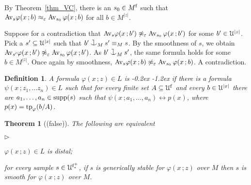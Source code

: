 \documentclass[10pt,openany]{article}
\newcommand{\mylabel}[1]{{\ssf{#1}}\hfill}
\renewenvironment{itemize}
  {\begin{list}{$\triangleright$}{%
   \setlength{\parskip}{0mm}
   \setlength{\topsep}{.4\baselineskip}
   \setlength{\rightmargin}{0mm}
   \setlength{\listparindent}{0mm}
   \setlength{\itemindent}{0mm}
   \setlength{\labelwidth}{3ex}
   \setlength{\itemsep}{.4\baselineskip}
   \setlength{\parsep}{0mm}
   \setlength{\partopsep}{0mm}
   \setlength{\labelsep}{1ex}
   \setlength{\leftmargin}{\labelwidth+\labelsep}
   \let\makelabel\mylabel}}{%
   \end{list}\vspace*{-\parskip}}
\def\supp{\mathop{\rm supp}}
\def\tp{{\rm tp}}
\def\cnonfork{\mathbin{\raise1.8ex\rlap{\kern0.6ex\rule{0.6ex}{0.1ex}}
\rlap{\kern1.1ex\rule{0.1ex}{1.9ex}}\raise-0.3ex\hbox{$\smile$} } }
\def\iff{\leftrightarrow}
\def\U{\EuScript U}
\def\phi{\varphi}
\def\epsilon{\varepsilon}
\def\ssf#1{\textsf{\small #1}}
\newcounter{thm}[section]
\theoremstyle{mio}
\newtheorem{theorem}[thm]{Theorem}
\newtheorem{definition}[thm]{Definition}
\theoremstyle{liscio}
\def\QED{\noindent\nolinebreak[4]\hspace{\stretch{1}}\rlap{\ \ $\Box$}\medskip}
\renewenvironment{proof}[1][Proof]%
{\begin{trivlist}\item[\hskip\labelsep {\bf #1}]}
{\QED\end{trivlist}}
\renewcommand*{\emph}[1]{%
   \kern-0.2ex 
   \smash{\tikz[baseline]
   \node[ rectangle, fill=emphcolor, rounded corners, 
          inner xsep=.3ex, inner ysep=.2ex, anchor=base,
          minimum height = 3ex
         ]{#1};
   }
   \kern-1.2ex 
}
\begin{document}
\begin{proof}
  By Theorem~\ref{thm_VC}, there is an $s_0\in M^{\rm f}$ such that $\Av_s\phi(x\,;b)\approx_\epsilon\Av_{s_0}\,\phi(x\,;b)$ for all $b\in M^{|z|}$.
  
  Suppose for a contradiction that $\Av_s\phi(x\,;b')\not\approx_\epsilon\Av_{s_0}\,\phi(x\,;b')$ for some $b'\in\U^{|z|}$.
  Pick a  $s'\subseteq\U^{|x|}$ such that $b'\cnonfork_{M}s'\equiv_Ms$.
  By the smoothness of $s$, we obtain $\Av_{s'}\phi(x\,;b')\not\approx_\epsilon\Av_{s_0}\,\phi(x\,;b')$.
  As $b'\cnonfork_{M}s'$, the same formula holds for some $b\in M^{|z|}$.
  Once again by smoothness, $\Av_s\phi(x\,;b)\not\approx_\epsilon\Av_{s_0}\,\phi(x\,;b)$.
  A contradiction.
\end{proof}



\begin{definition}
  A formula $\phi(x\,;z)\in L$ is \emph{distal\/} if there is a formula $\psi(x\,;z_1,\dots z_n)\in L$ such that for every finite set $A\subseteq\U^{\rm f}$ and every $b\in\U^{|x|}$ there are $a_1,\dots,a_n\in \supp(s)$ such that $\psi(x\,;a_1,\dots,a_n)\iff p(x)$, where $p(x)=\tp_\phi(b/A)$.\QED
\end{definition}

\begin{theorem}[(false)]
  The following are equivalent
  \begin{itemize}
    \item[1.] $\phi(x\,;z)\in L$ is distal;
    \item[2.] for every sample $s\in\U^{\rm f^+_*}$, if $s$ is generically stable for $\phi(x\,;z)$ over $M$ then $s$ is smooth for $\phi(x\,;z)$ over $M$.
  \end{itemize}
\end{theorem}
\end{document}
